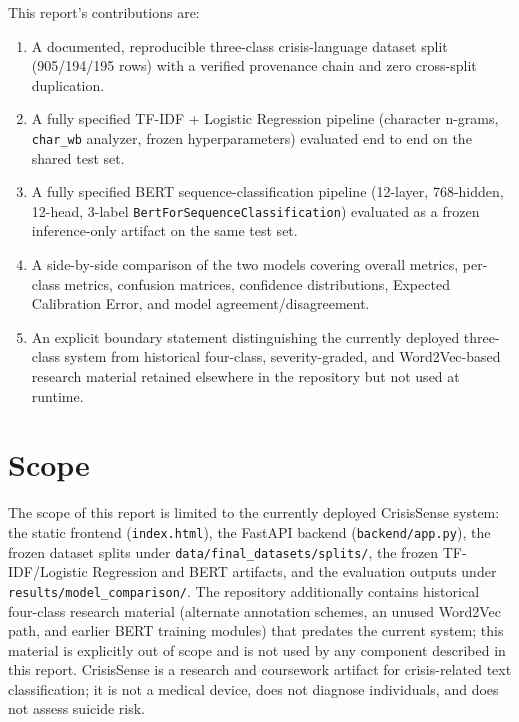 This report's contributions are:

\begin{enumerate}[nosep]
  \item A documented, reproducible three-class crisis-language dataset split (905/194/195 rows) with a verified provenance chain and zero cross-split duplication.
  \item A fully specified TF-IDF + Logistic Regression pipeline (character n-grams, \texttt{char\_wb} analyzer, frozen hyperparameters) evaluated end to end on the shared test set.
  \item A fully specified BERT sequence-classification pipeline (12-layer, 768-hidden, 12-head, 3-label \texttt{BertForSequenceClassification}) evaluated as a frozen inference-only artifact on the same test set.
  \item A side-by-side comparison of the two models covering overall metrics, per-class metrics, confusion matrices, confidence distributions, Expected Calibration Error, and model agreement/disagreement.
  \item An explicit boundary statement distinguishing the currently deployed three-class system from historical four-class, severity-graded, and Word2Vec-based research material retained elsewhere in the repository but not used at runtime.
\end{enumerate}

\section{Scope}

The scope of this report is limited to the currently deployed CrisisSense system: the static frontend (\texttt{index.html}), the FastAPI backend (\texttt{backend/\pbrk app.py}), the frozen dataset splits under \texttt{data/\pbrk final\_\pbrk datasets/\pbrk splits/\pbrk }, the frozen TF-IDF/Logistic Regression and BERT artifacts, and the evaluation outputs under \texttt{results/\pbrk model\_\pbrk comparison/\pbrk }. The repository additionally contains historical four-class research material (alternate annotation schemes, an unused Word2Vec path, and earlier BERT training modules) that predates the current system; this material is explicitly out of scope and is not used by any component described in this report. CrisisSense is a research and coursework artifact for crisis-related text classification; it is not a medical device, does not diagnose individuals, and does not assess suicide risk.
